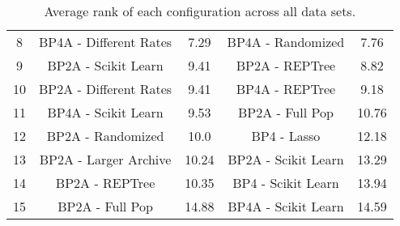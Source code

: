 \begin{table*}[ht]
\begin{adjustbox}{width=1\textwidth}
\begin{tabular}{ c | c c | c c }
8 & BP4A - Different Rates & 7.29 & BP4A - Randomized & 7.76 \\
9 & BP2A - Scikit Learn & 9.41 & BP2A - REPTree & 8.82 \\
10 & BP2A - Different Rates & 9.41 & BP4A - REPTree & 9.18 \\
11 & BP4A - Scikit Learn & 9.53 & BP2A - Full Pop & 10.76 \\
12 & BP2A - Randomized & 10.0 & BP4 - Lasso & 12.18 \\
13 & BP2A - Larger Archive & 10.24 & BP2A - Scikit Learn & 13.29 \\
14 & BP2A - REPTree & 10.35 & BP4 - Scikit Learn & 13.94 \\
15 & BP2A - Full Pop & 14.88 & BP4A - Scikit Learn & 14.59 \\
\hline
\end{tabular}
\end{adjustbox}
\caption{Average rank of each configuration across all data sets.}
\label{table:ranks}
\end{table*}

